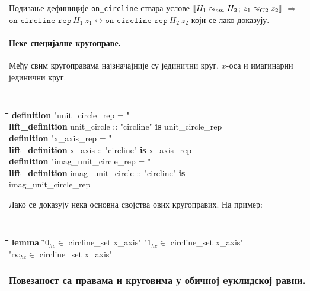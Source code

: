 \noindent Подизање дефиниције {\tt on\_circline} ствара услове
$\llbracket H_1 \approx_{cm} H_2$; $z_1 \approx_{C2} z_2 \rrbracket$
$\Longrightarrow$ $\mathtt{on\_circline\_rep}\ H_1\ z_1
\longleftrightarrow \mathtt{on\_circline\_rep}\ H_2\ z_2$ који се лако
доказују.


\paragraph{Неке специјалне кругоправе.}
Међу свим кругоправама најзначајније су јединични круг, $x$-оса и
имагинарни јединични круг.
{\tt
\begin{tabbing}
\hspace{5mm}\=\hspace{5mm}\=\hspace{5mm}\=\hspace{5mm}\=\hspace{5mm}\=\kill
\textbf{definition} "unit\_circle\_rep = "\\
\textbf{lift\_definition} unit\_circle :: "circline" \textbf{is} unit\_circle\_rep\\
\textbf{definition} "x\_axis\_rep = "\\
\textbf{lift\_definition} x\_axis :: "circline" \textbf{is} x\_axis\_rep\\
\textbf{definition} "imag\_unit\_circle\_rep = "\\
\textbf{lift}\=\textbf{\_definition} imag\_unit\_circle :: "circline" \textbf{is}\\
\> imag\_unit\_circle\_rep
\end{tabbing}
}

Лако се доказују нека основна својства ових кругоправих. На пример:
{\tt
\begin{tabbing}
\hspace{5mm}\=\hspace{5mm}\=\hspace{5mm}\=\hspace{5mm}\=\hspace{5mm}\=\kill
\textbf{lemma} \="$0_{hc} \in $ circline\_set x\_axis" "$1_{hc} \in $ circline\_set x\_axis" \\
\>"$\infty_{hc} \in $ circline\_set x\_axis"
\end{tabbing}
}

\subsubsection{Повезаност са правама и круговима у обичној eуклидској равни.}

